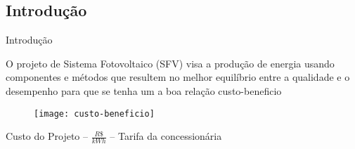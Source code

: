
\subsection*{Introdução}

\begin{frame}{Introdução}

O projeto de Sistema Fotovoltaico (SFV) visa a produção de energia usando componentes e métodos que resultem no melhor equilíbrio entre a qualidade e o desempenho para que se tenha um a boa relação custo-beneficio 

\begin{figure}[H]
	\texttt{[image: custo-beneficio]}
\end{figure}
      		
\begin{exampleblock}{}
\begin{center}
Custo do Projeto -- $\frac{R\$}{kWh}$ -- Tarifa da concessionária
\end{center} 
\end{exampleblock}

\end{frame}
